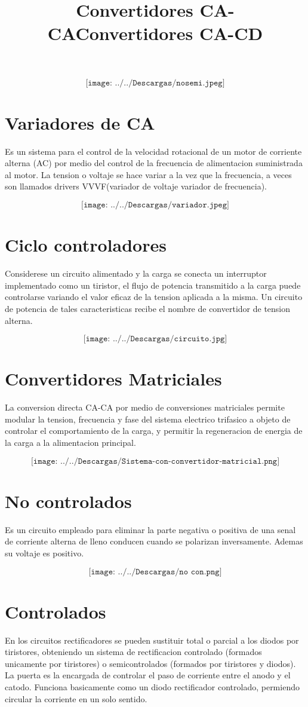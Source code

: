 \documentclass[12pt,a4paper]{report}
\begin{document}
$$\texttt{[image: ../../Descargas/nosemi.jpeg]} $$

\newpage
\title{Convertidores CA-CA}
\section{Variadores de CA}
Es un sistema para el control de la velocidad rotacional de un motor de corriente alterna (AC) por medio del control de la frecuencia de alimentacion suministrada al motor. La tension o voltaje se hace variar a la vez que la frecuencia, a veces son llamados drivers VVVF(variador de voltaje variador de frecuencia).

$$\texttt{[image: ../../Descargas/variador.jpeg]} $$
\section{Ciclo controladores}
Considerese un circuito alimentado y la carga se conecta un interruptor implementado como un tiristor, el flujo de potencia transmitido a la carga puede controlarse variando el valor eficaz de la tension aplicada a la misma. Un circuito de potencia de tales caracteristicas recibe el nombre de convertidor de tension alterna.

$$\texttt{[image: ../../Descargas/circuito.jpg]} $$
\section{Convertidores Matriciales}
La conversion directa CA-CA por medio de conversiones matriciales permite modular la tension, frecuencia y fase del sistema electrico trifasico a objeto de controlar el comportamiento de la carga, y permitir la regeneracion de energia de la carga a la alimentacion principal.

$$\texttt{[image: ../../Descargas/Sistema-con-convertidor-matricial.png]} $$

\newpage
\title{Convertidores CA-CD}
\section{No controlados}
Es un circuito empleado para eliminar la parte negativa o positiva de una senal de corriente alterna de lleno conducen cuando se polarizan inversamente. Ademas su voltaje es positivo.

$$\texttt{[image: ../../Descargas/no con.png]} $$

\section{Controlados}
En los circuitos rectificadores se pueden sustituir total o parcial a los diodos por tiristores, obteniendo un sistema de rectificacion controlado (formados unicamente por tiristores) o semicontrolados (formados por tiristores y diodos).
La puerta es la encargada de controlar el paso de corriente entre el anodo y el catodo. Funciona basicamente como un diodo rectificador controlado, permiendo circular la corriente en un solo sentido.
\end{document}
